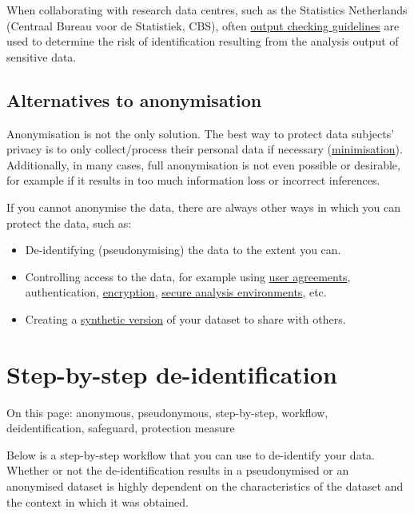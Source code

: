 \documentclass[
]{book}
\providecommand{\tightlist}{%
  \setlength{\itemsep}{0pt}\setlength{\parskip}{0pt}}
\begin{document}
When collaborating with research data centres, such as the Statistics Netherlands
(Centraal Bureau voor de Statistiek, CBS), often
\href{https://cros-legacy.ec.europa.eu/system/files/dwb_standalone-document_output-checking-guidelines.pdf}{output checking guidelines}
are used to determine the risk of identification resulting from the analysis
output of sensitive data.

\hypertarget{anonymisation-alternatives}{%
\subsection{Alternatives to anonymisation}\label{anonymisation-alternatives}}

Anonymisation is not the only solution. The best way to protect data subjects'
privacy is to only collect/process their personal data if necessary
(\protect\hyperlink{minimise}{minimisation}). Additionally, in many cases, full anonymisation
is not even possible or desirable, for example if it results in too much
information loss or incorrect inferences.

If you cannot anonymise the data, there are always other ways in which you can
protect the data, such as:

\begin{itemize}
\tightlist
\item
  De-identifying (pseudonymising) the data to the extent you can.
\item
  Controlling access to the data, for example using
  \protect\hyperlink{agreements}{user agreements}, authentication, \protect\hyperlink{encryption}{encryption},
  \protect\hyperlink{secure-computation}{secure analysis environments}, etc.
\item
  Creating a \protect\hyperlink{synthetic-data}{synthetic version} of your dataset to share with
  others.
\end{itemize}

\hypertarget{deidentification-workflow}{%
\section{Step-by-step de-identification}\label{deidentification-workflow}}

On this page: anonymous, pseudonymous, step-by-step, workflow, deidentification,
safeguard, protection measure

Below is a step-by-step workflow that you can use to de-identify your data.
Whether or not the de-identification results in a pseudonymised or an anonymised
dataset is highly dependent on the characteristics of the dataset and the context
in which it was obtained.
\end{document}
